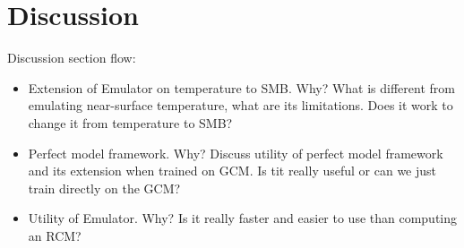 \documentclass[a4paper,11pt,oneside]{report}
\begin{document}

\chapter{Discussion}
Discussion section flow:
\begin{itemize}
    \item Extension of Emulator on temperature to SMB. Why? What is different from emulating near-surface temperature, what are its limitations. Does it work to change it from temperature to SMB? 
    \item Perfect model framework. Why? Discuss utility of perfect model framework and its extension when trained on GCM. Is tit really useful or can we just train directly on the GCM?  
    \item Utility of Emulator. Why? Is it really faster and easier to use than computing an RCM? 
\end{itemize}
\end{document}
